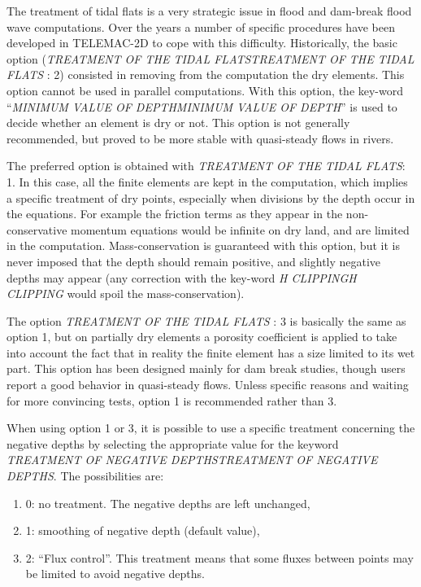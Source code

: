 \documentclass{article} %
\begin{document}
 The treatment of tidal flats is a very strategic issue in flood and dam-break flood wave computations. Over the years a number of specific procedures have been developed in TELEMAC-2D to cope with this difficulty. Historically, the basic option (\textit{TREATMENT OF THE TIDAL FLATSTREATMENT OF THE TIDAL FLATS} : 2) consisted in removing from the computation the dry elements. This option cannot be used in parallel computations. With this option, the key-word ``\textit{MINIMUM VALUE OF DEPTHMINIMUM VALUE OF DEPTH}'' is used to decide whether an element is dry or not. This option is not generally recommended, but proved to be more stable with quasi-steady flows in rivers.

 The preferred option is obtained with \textit{TREATMENT OF THE TIDAL FLATS}: 1. In this case, all the finite elements are kept in the computation, which implies a specific treatment of dry points, especially when divisions by the depth occur in the equations. For example the friction terms as they appear in the non-conservative momentum equations would be infinite on dry land, and are limited in the computation. Mass-conservation is guaranteed with this option, but it is never imposed that the depth should remain positive, and slightly negative depths may appear (any correction with the key-word \textit{H CLIPPINGH CLIPPING} would spoil the mass-conservation).

 The option \textit{TREATMENT OF THE TIDAL FLATS} : 3 is basically the same as option 1, but on partially dry elements a porosity coefficient is applied to take into account the fact that in reality the finite element has a size limited to its wet part. This option has been designed mainly for dam break studies, though users report a good behavior in quasi-steady flows. Unless specific reasons and waiting for more convincing tests, option 1 is recommended rather than 3.

 When using option 1 or 3, it is possible to use a specific treatment concerning the negative depths by selecting the appropriate value for the keyword \textit{TREATMENT OF NEGATIVE DEPTHSTREATMENT OF NEGATIVE DEPTHS}. The possibilities are:

\begin{enumerate}
\item  0: no treatment. The negative depths are left unchanged,

\item  1: smoothing of negative depth (default value),

\item  2: ``Flux control''. This treatment means that some fluxes between points may be limited to avoid negative depths.
\end{enumerate}
\end{document}
